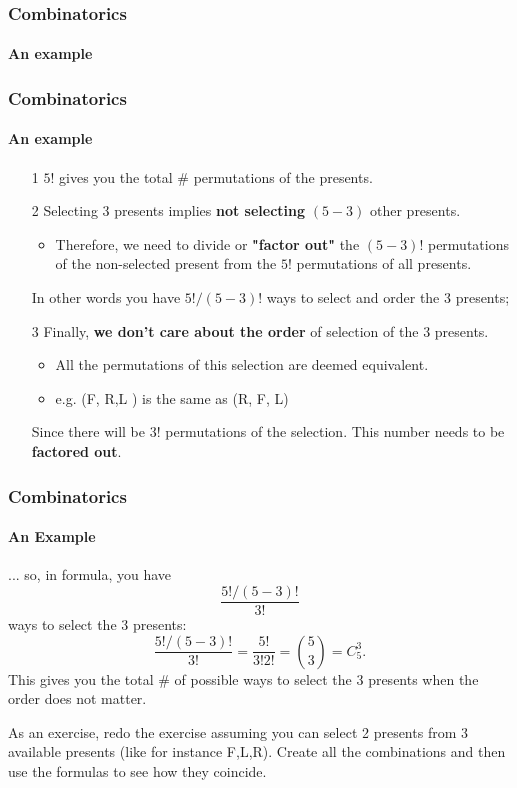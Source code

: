 \documentclass[notes=show]{beamer}\usepackage[]{graphicx}\usepackage[]{color}
\begin{document}
\begin{frame}
\frametitle{Combinatorics}
\framesubtitle{An example}

\end{frame}


%
%
%
%

\begin{frame}
\frametitle{Combinatorics}
\framesubtitle{An example}
\begin{example}[Interpretation]
\begin{itemize}
\item[1] $5!$ gives you the total $\#$ permutations of the presents.
\item[2] Selecting $3$ presents implies \textbf{not selecting} $(5-3)$ other presents.
\begin{itemize}
\item Therefore, we need to divide or \textbf{"factor out"} the $(5-3)!$ permutations of the non-selected present  from the $5!$ permutations of all presents.
\end{itemize}
In other words you have $5! / (5-3) !$ ways to select and order the 3 presents;
\item[3] Finally, \textbf{we don't care about the order} of selection of the $3$ presents.
\begin{itemize}
\item All the permutations of this selection are deemed equivalent.
\item  e.g. (F, R,L ) is the same as (R, F, L)
\end{itemize}
Since there will be $3!$ permutations of the selection. This number needs to be \textbf{factored out}.
\end{itemize}
\end{example}

\end{frame}

\begin{frame}
\frametitle{Combinatorics}
\framesubtitle{An Example}
\begin{example}[continued]
... so, in formula, you have $$\frac{5!/(5-3)!}{3!}$$ ways to select the $3$ presents:
$$
\frac{5!/(5-3)!}{3!}= \frac{5!}{3!2!} = \binom 5 3 = C_5^3.
$$
This gives you the total $\#$ of possible ways to select the $3$ presents when the order does not matter.
\end{example}

As an exercise, redo the exercise assuming you can select 2 presents from 3 available presents
(like for instance F,L,R). Create all the combinations and then use the formulas to see how they coincide.

\end{frame}
\end{document}
